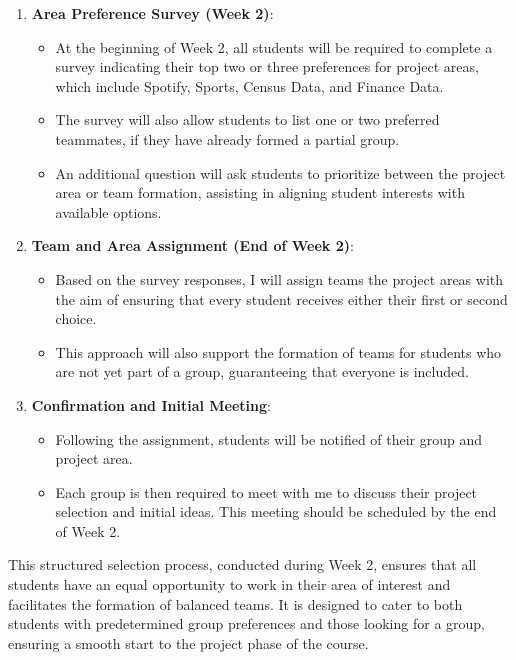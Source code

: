 \documentclass[
  letterpaper,
  DIV=11,
  numbers=noendperiod]{scrartcl}
\providecommand{\tightlist}{%
  \setlength{\itemsep}{0pt}\setlength{\parskip}{0pt}}\usepackage{longtable,booktabs,array}
\begin{document}
\begin{enumerate}
\def\labelenumi{\arabic{enumi}.}
\tightlist
\item
  \textbf{Area Preference Survey (Week 2)}:

  \begin{itemize}
  \tightlist
  \item
    At the beginning of Week 2, all students will be required to
    complete a survey indicating their top two or three preferences for
    project areas, which include Spotify, Sports, Census Data, and
    Finance Data.
  \item
    The survey will also allow students to list one or two preferred
    teammates, if they have already formed a partial group.
  \item
    An additional question will ask students to prioritize between the
    project area or team formation, assisting in aligning student
    interests with available options.
  \end{itemize}
\item
  \textbf{Team and Area Assignment (End of Week 2)}:

  \begin{itemize}
  \tightlist
  \item
    Based on the survey responses, I will assign teams the project areas
    with the aim of ensuring that every student receives either their
    first or second choice.
  \item
    This approach will also support the formation of teams for students
    who are not yet part of a group, guaranteeing that everyone is
    included.
  \end{itemize}
\item
  \textbf{Confirmation and Initial Meeting}:

  \begin{itemize}
  \tightlist
  \item
    Following the assignment, students will be notified of their group
    and project area.
  \item
    Each group is then required to meet with me to discuss their project
    selection and initial ideas. This meeting should be scheduled by the
    end of Week 2.
  \end{itemize}
\end{enumerate}

This structured selection process, conducted during Week 2, ensures that
all students have an equal opportunity to work in their area of interest
and facilitates the formation of balanced teams. It is designed to cater
to both students with predetermined group preferences and those looking
for a group, ensuring a smooth start to the project phase of the course.
\end{document}
